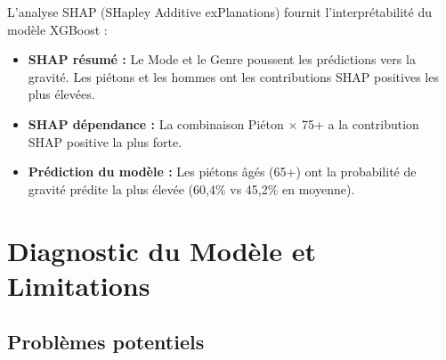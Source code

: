 \documentclass[12pt,a4paper]{article}
\begin{document}
L'analyse SHAP (SHapley Additive exPlanations) fournit l'interprétabilité
du modèle XGBoost :

\begin{itemize}
  \item \textbf{SHAP résumé :} Le Mode et le Genre poussent les prédictions
        vers la gravité. Les piétons et les hommes ont les contributions
        SHAP positives les plus élevées.
  \item \textbf{SHAP dépendance :} La combinaison Piéton $\times$ 75+ a
        la contribution SHAP positive la plus forte.
  \item \textbf{Prédiction du modèle :} Les piétons âgés (65+) ont la
        probabilité de gravité prédite la plus élevée (60,4\% vs 45,2\%
        en moyenne).
\end{itemize}


\section{Diagnostic du Modèle et Limitations}

\subsection{Problèmes potentiels}
\end{document}
